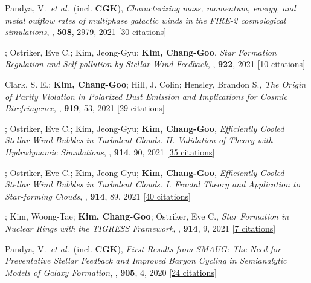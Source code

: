 \item[{36.}]Pandya, V.~\textit{et al.}~(incl. \textbf{CGK}), \textit{Characterizing mass, momentum, energy, and metal outflow rates of multiphase galactic winds in the FIRE-2 cosmological simulations}, , \textbf{508}, 2979, 2021 [\href{http://adsabs.harvard.edu/abs/2021MNRAS.508.2979P}{30 citations}]

\item[{35.}]; Ostriker, Eve C.; Kim, Jeong-Gyu; \textbf{Kim, Chang-Goo}, \textit{Star Formation Regulation and Self-pollution by Stellar Wind Feedback}, , \textbf{922}, 2021 [\href{http://adsabs.harvard.edu/abs/2021ApJ...922L...3L}{10 citations}]

\item[{34.}]Clark, S. E.; \textbf{Kim, Chang-Goo}; Hill, J. Colin; Hensley, Brandon S., \textit{The Origin of Parity Violation in Polarized Dust Emission and Implications for Cosmic Birefringence}, , \textbf{919}, 53, 2021 [\href{http://adsabs.harvard.edu/abs/2021ApJ...919...53C}{29 citations}]

\item[{33.}]; Ostriker, Eve C.; Kim, Jeong-Gyu; \textbf{Kim, Chang-Goo}, \textit{Efficiently Cooled Stellar Wind Bubbles in Turbulent Clouds. II. Validation of Theory with Hydrodynamic Simulations}, , \textbf{914}, 90, 2021 [\href{http://adsabs.harvard.edu/abs/2021ApJ...914...90L}{35 citations}]

\item[{32.}]; Ostriker, Eve C.; Kim, Jeong-Gyu; \textbf{Kim, Chang-Goo}, \textit{Efficiently Cooled Stellar Wind Bubbles in Turbulent Clouds. I. Fractal Theory and Application to Star-forming Clouds}, , \textbf{914}, 89, 2021 [\href{http://adsabs.harvard.edu/abs/2021ApJ...914...89L}{40 citations}]

\item[{31.}]; Kim, Woong-Tae; \textbf{Kim, Chang-Goo}; Ostriker, Eve C., \textit{Star Formation in Nuclear Rings with the TIGRESS Framework}, , \textbf{914}, 9, 2021 [\href{http://adsabs.harvard.edu/abs/2021ApJ...914....9M}{7 citations}]

\item[{30.}]Pandya, V.~\textit{et al.}~(incl. \textbf{CGK}), \textit{First Results from SMAUG: The Need for Preventative Stellar Feedback and Improved Baryon Cycling in Semianalytic Models of Galaxy Formation}, , \textbf{905}, 4, 2020 [\href{http://adsabs.harvard.edu/abs/2020ApJ...905....4P}{24 citations}]

